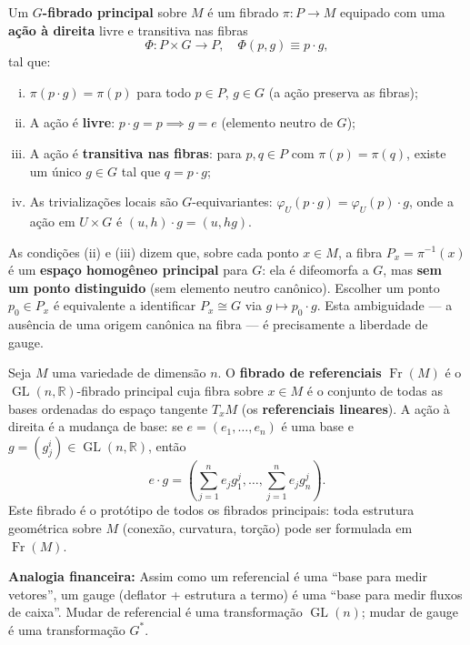 \begin{defi}\label{def:fibrado_principal}
Um \textbf{$G$-fibrado principal} sobre $M$ \'e um fibrado
$\pi: P \to M$ equipado com uma \textbf{a\c{c}\~ao \`a direita} livre e
transitiva nas fibras
\begin{equation}\label{eq:acao_direita}
 \Phi: P \times G \to P, \quad \Phi(p, g) \equiv p \cdot g,
\end{equation}
tal que:
\begin{enumerate}[(i)]
 \item $\pi(p \cdot g) = \pi(p)$ para todo $p \in P$, $g \in G$ (a a\c{c}\~ao
 preserva as fibras);
 \item A a\c{c}\~ao \'e \textbf{livre}: $p \cdot g = p \implies g = e$
 (elemento neutro de $G$);
 \item A a\c{c}\~ao \'e \textbf{transitiva nas fibras}: para $p, q \in P$ com
 $\pi(p) = \pi(q)$, existe um \'unico $g \in G$ tal que $q = p \cdot g$;
 \item As trivializa\c{c}\~oes locais s\~ao $G$-equivariantes:
 $\varphi_U(p \cdot g) = \varphi_U(p) \cdot g$, onde a a\c{c}\~ao em
 $U \times G$ \'e $(u, h) \cdot g = (u, hg)$.
\end{enumerate}
\end{defi}

\begin{obs}[Interpreta\c{c}\~ao]
As condi\c{c}\~oes (ii) e (iii) dizem que, sobre cada ponto $x \in M$, a fibra
$P_x = \pi^{-1}(x)$ \'e um \textbf{espa\c{c}o homog\^eneo principal} para $G$:
ela \'e difeomorfa a $G$, mas \textbf{sem um ponto distinguido} (sem elemento
neutro can\^onico). Escolher um ponto $p_0 \in P_x$ \'e equivalente a
identificar $P_x \cong G$ via $g \mapsto p_0 \cdot g$. Esta ambiguidade ---
a aus\^encia de uma origem can\^onica na fibra --- \'e precisamente a
liberdade de gauge.
\end{obs}

\begin{ex}\label{ex:referenciais}
Seja $M$ uma variedade de dimens\~ao $n$. O \textbf{fibrado de referenciais}
$\operatorname{Fr}(M)$ \'e o $\operatorname{GL}(n, \mathbb{R})$-fibrado
principal cuja fibra sobre $x \in M$ \'e o conjunto de todas as bases
ordenadas do espa\c{c}o tangente $T_xM$ (os \textbf{referenciais lineares}).
A a\c{c}\~ao \`a direita \'e a mudan\c{c}a de base: se $e = (e_1, \dots, e_n)$
\'e uma base e $g = (g^i_j) \in \operatorname{GL}(n, \mathbb{R})$, ent\~ao
\begin{equation}
 e \cdot g = \left(\sum_{j=1}^n e_j g^j_1, \dots, \sum_{j=1}^n e_j g^j_n\right).
\end{equation}
Este fibrado \'e o prot\'otipo de todos os fibrados principais: toda
estrutura geom\'etrica sobre $M$ (conex\~ao, curvatura, tor\c{c}\~ao) pode ser
formulada em $\operatorname{Fr}(M)$.

\textbf{Analogia financeira:} Assim como um referencial \'e uma ``base para
medir vetores'', um gauge (deflator + estrutura a termo) \'e uma ``base para
medir fluxos de caixa''. Mudar de referencial \'e uma transforma\c{c}\~ao
$\operatorname{GL}(n)$; mudar de gauge \'e uma transforma\c{c}\~ao $G^*$.
\end{ex}

